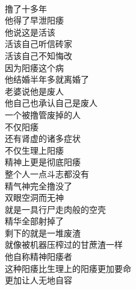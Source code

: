 \begin{adjustwidth}{-1em}{-1em}
    \begin{poem}[精神阳痿者]
        \begin{multicols}{3}
            \centering~\\
            撸了十多年 \\ 他得了早泄阳痿 \\ 他说这是活该 \\ 活该自己听信砖家 \\ 活该自己不知悔改 \\ 因为阳痿这个病 \\ 他结婚半年多就离婚了 \\ 老婆说他是废人 \\ 他自己也承认自己是废人 \\ 一个被撸管废掉的人 \\ 不仅阳痿 \\ 还有肾虚的诸多症状 \\ 不仅生理上阳痿 \\ 精神上更是彻底阳痿 \\ 整个人一点斗志都没有 \\ 精气神完全撸没了 \\ 双眼空洞而无神 \\ 就是一具行尸走肉般的空壳 \\ 精华全部射掉了 \\ 剩下的就是一堆废渣 \\ 就像被机器压榨过的甘蔗渣一样 \\ 他自称精神阳痿者 \\ 这种阳痿比生理上的阳痿更加要命 \\ 更加让人无地自容
        \end{multicols}
    \end{poem}
\end{adjustwidth}

